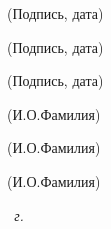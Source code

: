 \begin{titlepage}
\begin{adjustbox}{minipage=0.35\textwidth,valign=T}
\begin{flushleft}
    \end{flushleft}
        \bigskip
    \begin{flushleft}
        \footnotesize
        \wleadprefix%
    \end{flushleft}
    \ifx\wsecondlead\undefined\else
        \vspace{0pt}
    \begin{flushleft}
        \footnotesize
        \wleadprefix%
    \end{flushleft}
    \fi
\end{adjustbox}
\hfill
\begin{adjustbox}{minipage=0.3\linewidth,valign=T}
        \vspace{7pt}

    \begin{center}
        \footnotesize
        \uline{\hfill}

        (Подпись, дата)
    \end{center}
        \bigskip
    \begin{center}
        \footnotesize
        \uline{\hfill}

        (Подпись, дата)
    \end{center}
    \ifx\wsecondlead\undefined\else
    \begin{center}
        \footnotesize
        \uline{\hfill}

        (Подпись, дата)
    \end{center}
    \fi
\end{adjustbox}
\hfill
\begin{adjustbox}{minipage=0.3\linewidth,valign=T}
    \wauthorspace\begin{center}
        \footnotesize
        \uline{\hfill\wauthor\hfill}

        (И.О.Фамилия)
    \end{center}
        \bigskip
    \begin{center}
        \footnotesize
        \uline{\hfill\wfirstlead\hfill}

        (И.О.Фамилия)
    \end{center}
    \ifx\wsecondlead\undefined\else
    \begin{center}
        \footnotesize
        \uline{\hfill\wsecondlead\hfill}

        (И.О.Фамилия)
    \end{center}
    \fi
\end{adjustbox}

\vfill

\begin{center}
    \textit{\the\year\ г.}
\end{center}

\end{titlepage}

